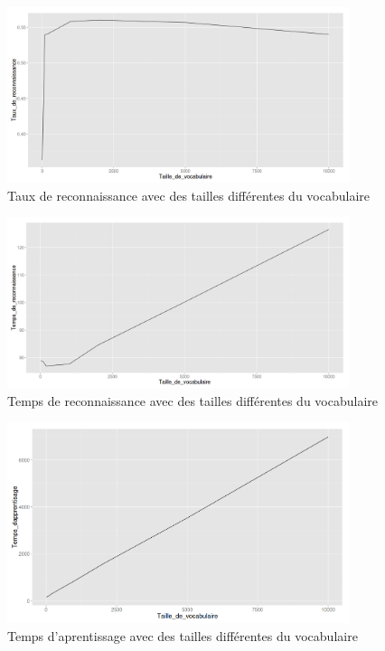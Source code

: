 \documentclass[french,12pt,a4paper,oneside,notitlepage]{report}
\begin{document}
\begin{figure}[ht]
	\begin{center}
	  \includegraphics[width=10cm]{dictionarySize.png}
	\end{center}
	 \caption{Taux de reconnaissance avec des tailles différentes du vocabulaire}
\end{figure}
\begin{figure}[ht]
	\begin{center}
	  \includegraphics[width=10cm]{time.png}
	\end{center}
	 \caption{Temps de reconnaissance avec des tailles différentes du vocabulaire}
\end{figure}
\begin{figure}[ht]
	\begin{center}
	  \includegraphics[width=10cm]{ta.png}
	\end{center}
	 \caption{Temps d'aprentissage avec des tailles différentes du vocabulaire}
\end{figure}
\end{document}
